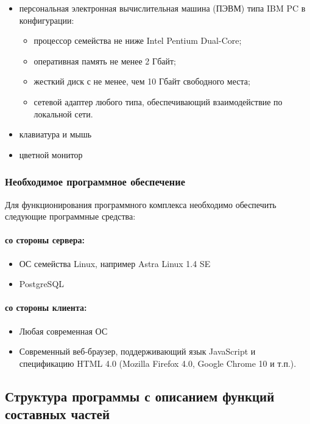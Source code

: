 \begin{itemize}
\item персональная электронная вычислительная машина (ПЭВМ) типа IBM PC в
конфигурации:

\begin{itemize}
\item процессор семейства не ниже Intel Pentium Dual-Core;
\item оперативная память не менее 2 Гбайт;
\item жесткий диск с не менее, чем 10 Гбайт свободного места;
\item сетевой адаптер любого типа, обеспечивающий взаимодействие по локальной сети.
\end{itemize}
\item клавиатура и мышь
\item цветной монитор
\end{itemize}


\subsubsection{Необходимое программное обеспечение}

Для функционирования программного комплекса необходимо обеспечить следующие программные средства: 

\paragraph*{со стороны сервера:} \hfill

\begin{itemize}
\item ОС семейства Linux, например Astra Linux 1.4 SE
\item PostgreSQL
\end{itemize}

\paragraph*{со стороны клиента:} \hfill

\begin{itemize}
\item Любая современная ОС
\item Современный веб-браузер, поддерживающий язык JavaScript и спецификацию HTML 4.0 (Mozilla Firefox 4.0, Google Chrome 10 и т.п.).
\end{itemize}

\clearpage
\subsection{Структура программы с описанием функций составных частей}

